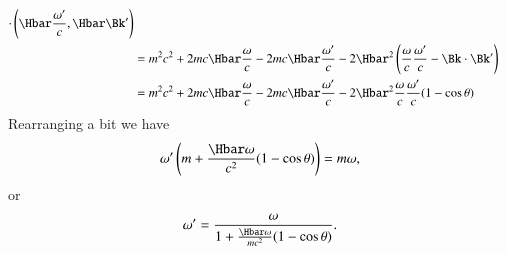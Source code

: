 {\begin{equation}
\begin{aligned}
\cdot \left(\Hbar \frac{\omega'}{c}, \Hbar \Bk' \right) \\
&=
m^2 c^2 + 2 m c \Hbar \frac{\omega}{c} - 2 m c \Hbar \frac{\omega'}{c}
- 2\Hbar^2 \left(
\frac{\omega}{c} \frac{\omega'}{c}
-
\Bk \cdot \Bk'
\right) \\
&=
m^2 c^2 + 2 m c \Hbar \frac{\omega}{c} - 2 m c \Hbar \frac{\omega'}{c}
- 2\Hbar^2
\frac{\omega}{c} \frac{\omega'}{c} (1 - \cos\theta)
\end{aligned}
\end{equation}
%
Rearranging a bit we have
%
\begin{equation}\label{eqn:relativisticElectrodynamicsExamReflection:430}
\omega' \left( m + \frac{\Hbar \omega}{c^2} ( 1 - \cos\theta ) \right) = m \omega,
\end{equation}
or
\begin{equation}\label{eqn:relativisticElectrodynamicsExamReflection:450}
\omega' = \frac{\omega}{
1 + \frac{\Hbar \omega}{m c^2} ( 1 - \cos\theta )
}.
\end{equation}
} %
